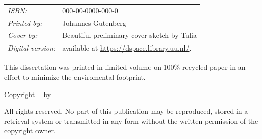 \begin{titlepage}
\noindent
\begin{tabular}{@{}p{}@{}p{}}
        \textit{ISBN:} &  000-00-0000-000-0 \\[\medskipamount]
        \textit{Printed by:} & Johannes Gutenberg \\[\medskipamount]
        \textit{Cover by:} & Beautiful preliminary cover sketch by Talia \\[\medskipamount]
        \textit{Digital version:} & available at \url{https://dspace.library.uu.nl/}.
\end{tabular}

\medskip



\noindent This dissertation was printed in limited volume on 100\% recycled paper in an effort to minimize the enviromental footprint.

\vspace{4\medskipamount}



\noindent Copyright \textcopyright\ \the\year{} by {\makeatletter\@firstname~\@lastname \makeatother}

All rights reserved. No part of this publication may be reproduced, stored in a retrieval system or transmitted in any form without the written permission of the copyright owner.








\clearpage

\thispagestyle{empty}

\begin{center}

        \vspace*{2\bigskipamount}


\end{center}
\end{titlepage}
